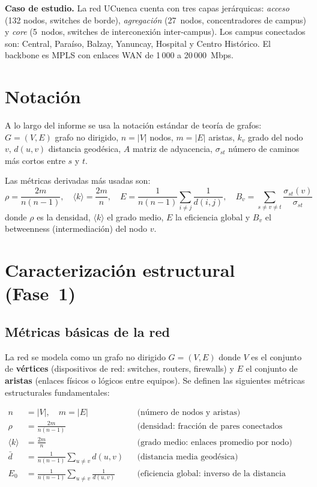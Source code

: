\documentclass[12pt, a4paper]{article}
\newcommand{\prom}[1]{\langle #1 \rangle}
\begin{document}
\textbf{Caso de estudio.} La red UCuenca cuenta con tres capas jerárquicas:
\textit{acceso} (132 nodos, switches de borde), \textit{agregación}
(27~nodos, concentradores de campus) y \textit{core} (5~nodos, switches de
interconexión inter-campus). Los campus conectados son: Central, Paraíso,
Balzay, Yanuncay, Hospital y Centro Histórico. El backbone es MPLS con enlaces
WAN de 1\,000 a 20\,000~Mbps.

\section*{Notación}

A lo largo del informe se usa la notación estándar de teoría de grafos:
$G=(V,E)$ grafo no dirigido, $n=|V|$ nodos, $m=|E|$ aristas, $k_v$ grado del
nodo $v$, $d(u,v)$ distancia geodésica, $A$ matriz de adyacencia,
$\sigma_{st}$ número de caminos más cortos entre $s$ y $t$.

Las métricas derivadas más usadas son:
\[
  \rho = \frac{2m}{n(n-1)}, \quad
  \prom{k} = \frac{2m}{n}, \quad
  E = \frac{1}{n(n-1)}\sum_{i\neq j}\frac{1}{d(i,j)}, \quad
  B_v = \sum_{s\neq v\neq t}\frac{\sigma_{st}(v)}{\sigma_{st}}
\]
donde $\rho$ es la densidad, $\prom{k}$ el grado medio, $E$ la eficiencia
global y $B_v$ el betweenness (intermediación) del nodo $v$.

\section{Caracterización estructural (Fase~1)}

\subsection{Métricas básicas de la red}

La red se modela como un grafo no dirigido $G=(V,E)$ donde $V$ es el conjunto
de \textbf{vértices} (dispositivos de red: switches, routers, firewalls) y $E$
el conjunto de \textbf{aristas} (enlaces físicos o lógicos entre equipos).
Se definen las siguientes métricas estructurales fundamentales:

\begin{align*}
  n &= |V|, \quad m = |E|
    && \text{(número de nodos y aristas)} \\[3pt]
  \rho &= \frac{2m}{n(n-1)}
    && \text{(densidad: fracción de pares conectados sobre el total posible)} \\[3pt]
  \langle k \rangle &= \frac{2m}{n}
    && \text{(grado medio: enlaces promedio por nodo)} \\[3pt]
  \bar{d} &= \frac{1}{n(n-1)}\sum_{u \neq v} d(u,v)
    && \text{(distancia media geodésica)} \\[3pt]
  E_0 &= \frac{1}{n(n-1)}\sum_{u \neq v} \frac{1}{d(u,v)}
    && \text{(eficiencia global: inverso de la distancia media)}
\end{align*}
\end{document}
